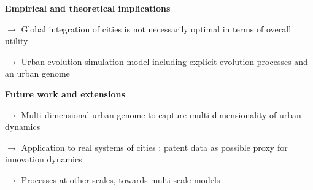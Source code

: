 {\textbf{Empirical and theoretical implications}

\smallskip

$\rightarrow$ Global integration of cities is not necessarily optimal in terms of overall utility

\smallskip

$\rightarrow$ Urban evolution simulation model including explicit evolution processes and an urban genome

\medskip

\textbf{Future work and extensions}

\smallskip

$\rightarrow$ Multi-dimensional urban genome to capture multi-dimensionality of urban dynamics \cite{hidalgo2007product}

\smallskip

$\rightarrow$ Application to real systems of cities \cite{2020arXiv200510007R}: patent data as possible proxy for innovation dynamics \cite{bergeaud2017classifying}

\smallskip

$\rightarrow$ Processes at other scales, towards multi-scale models \cite{raimbault:halshs-02351722}


}









